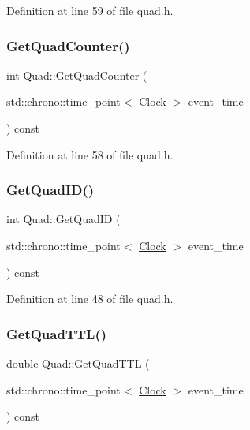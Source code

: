 Definition at line 59 of file quad.\+h.

\mbox{\label{class_quad_a56ac193fa18af6ec468463cc16588cc1}} 
\subsubsection{\texorpdfstring{Get\+Quad\+Counter()}{GetQuadCounter()}}
{\footnotesize\ttfamily int Quad\+::\+Get\+Quad\+Counter (\begin{DoxyParamCaption}\item[{std\+::chrono\+::time\+\_\+point$<$ \hyperlink{universe_8h_a0ef8d951d1ca5ab3cfaf7ab4c7a6fd80}{Clock} $>$}]{event\+\_\+time }\end{DoxyParamCaption}) const\hspace{0.3cm}{\ttfamily [inline]}}



Definition at line 58 of file quad.\+h.

\mbox{\label{class_quad_aba78e3b63f568529fcae1cfa6c3c54bf}} 
\subsubsection{\texorpdfstring{Get\+Quad\+I\+D()}{GetQuadID()}}
{\footnotesize\ttfamily int Quad\+::\+Get\+Quad\+ID (\begin{DoxyParamCaption}\item[{std\+::chrono\+::time\+\_\+point$<$ \hyperlink{universe_8h_a0ef8d951d1ca5ab3cfaf7ab4c7a6fd80}{Clock} $>$}]{event\+\_\+time }\end{DoxyParamCaption}) const\hspace{0.3cm}{\ttfamily [inline]}}



Definition at line 48 of file quad.\+h.

\mbox{\label{class_quad_ab17ff4d689675e80107ecf6588811eee}} 
\subsubsection{\texorpdfstring{Get\+Quad\+T\+T\+L()}{GetQuadTTL()}}
{\footnotesize\ttfamily double Quad\+::\+Get\+Quad\+T\+TL (\begin{DoxyParamCaption}\item[{std\+::chrono\+::time\+\_\+point$<$ \hyperlink{universe_8h_a0ef8d951d1ca5ab3cfaf7ab4c7a6fd80}{Clock} $>$}]{event\+\_\+time }\end{DoxyParamCaption}) const\hspace{0.3cm}{\ttfamily [inline]}}



